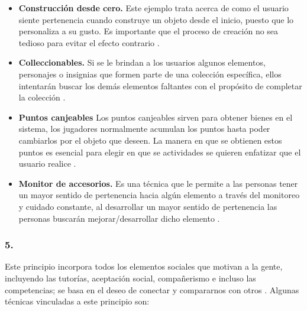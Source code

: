     \begin{itemize}
    \item
    {\bf Construcción desde cero.}
        Este ejemplo trata acerca de como el usuario siente pertenencia cuando construye
        un objeto desde el inicio, puesto que lo personaliza a su gusto. Es importante que
        el proceso de creación no sea tedioso para evitar el efecto contrario \cite[p. 182]{Octalysis}.

    \item
    {\bf Colleccionables.}
        Si se le brindan a los usuarios algunos elementos, personajes o insignias que
        formen parte de una colección específica, ellos intentarán buscar los demás
        elementos faltantes con el propósito de completar la colección \cite[p. 183]{Octalysis}.

    \item
    {\bf Puntos canjeables}
        Los puntos canjeables sirven para obtener bienes en el sistema, los jugadores
        normalmente acumulan los puntos hasta poder cambiarlos por el objeto que deseen.
        La manera en que se obtienen estos puntos es esencial para elegir en que se
        actividades se quieren enfatizar que el usuario realice \cite[p. 187]{Octalysis}.

    \item
    {\bf Monitor de accesorios.}
        Es una técnica que le permite a las personas tener un mayor sentido de pertenencia
        hacia algún elemento a través del monitoreo y cuidado constante, al desarrollar un
        mayor sentido de pertenencia las personas buscarán mejorar/desarrollar dicho elemento
        \cite[p. 189]{Octalysis}.

    \end{itemize}

\subsubsection{5. \principioV} \label{subsec:principioV}

 Este principio incorpora todos los elementos sociales que motivan a la gente, incluyendo
 las tutorías, aceptación social, compañerismo e incluso las competencias; se basa en el
 deseo de conectar y compararnos con otros \cite[pp. 27, 197]{Octalysis}. Algunas técnicas
 vinculadas a este principio son:

